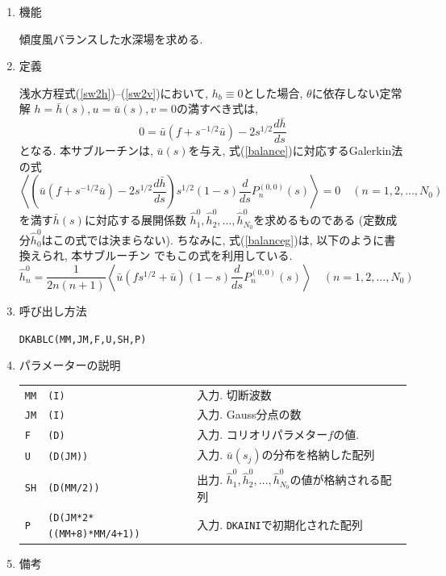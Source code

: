\documentclass[a4j,fleqn]{jarticle}
\begin{document}
\begin{enumerate}

\item 機能

傾度風バランスした水深場を求める.

\item 定義

浅水方程式(\ref{sw2h})--(\ref{sw2v})において,
$h_b\equiv 0$とした場合, $\theta$に依存しない定常解
$h=\bar h(s), u=\bar u(s), v=0$の満すべき式は,
\begin{equation}
0
= \bar u\left(f+s^{-1/2}\bar u\right)
   -2s^{1/2}\frac{d\bar h}{ds}
\label{balance}   
\end{equation}
となる. 本サブルーチンは, $\bar u(s)$を与え,
式(\ref{balance})に対応するGalerkin法の式
\begin{equation}
\left\langle\left(\bar u\left(f+s^{-1/2}\bar u\right)
   -2s^{1/2}\frac{d\bar h}{ds}\right)
s^{1/2}(1-s)\frac{d}{ds}P^{(0,0)}_n(s)\right\rangle
=0\quad (n=1,2,\dots,N_0)
\label{balanceg}   
\end{equation}
を満す$\bar h(s)$に対応する展開係数
$\hat h^0_1, \hat h^0_2,\dots, \hat h^0_{N_0}$を求めるものである
(定数成分$\hat h^0_0$はこの式では決まらない).
ちなみに, 式(\ref{balanceg})は, 以下のように書換えられ, 本サブルーチン
でもこの式を利用している.
\begin{equation}
\hat h^0_n
=
\frac1{2n(n+1)}
\left\langle\bar u\left(fs^{1/2}+\bar u\right)
(1-s)\frac{d}{ds}P^{(0,0)}_n(s)\right\rangle
\quad (n=1,2,\dots,N_0)
\label{balanceg2}   
\end{equation}

\item 呼び出し方法 
    
{\tt DKABLC(MM,JM,F,U,SH,P)}
  
\item パラメーターの説明 
    
\begin{tabular}{lll}
{\tt MM} & {\tt (I)} & 入力. 切断波数\\
{\tt JM} & {\tt (I)} & 入力. Gauss分点の数\\
{\tt F}   & {\tt (D)} & 入力. コリオリパラメター$f$の値.\\
{\tt U}   & {\tt (D(JM))} & 入力. $\bar u(s_j)$の分布を格納した配列\\
{\tt SH}   & {\tt (D(MM/2))} & 出力. $\hat h^0_1, \hat h^0_2,\dots, \hat h^0_{N_0}$の値が格納される配列\\
{\tt P}  & {\tt (D(JM*2*((MM+8)*MM/4+1))} & 入力. {\tt DKAINI}で初期化された配列\\
\end{tabular}

\item 備考

\end{enumerate}
\end{document}
